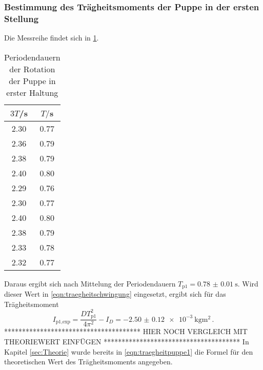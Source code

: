 \subsubsection{Bestimmung des Trägheitsmoments der Puppe in der ersten Stellung}
Die Messreihe findet sich in \ref{tab:puppe1}.
\begin{table}
\centering
\caption{Periodendauern der Rotation der Puppe in erster Haltung}
\label{tab:puppe1}
\begin{tabular}{c c}
\toprule
$3T$/s & $T/$s \\
\midrule
2.30 & 0.77 \\
2.36 & 0.79 \\
2.38 & 0.79 \\
2.40 & 0.80 \\
2.29 & 0.76 \\
2.30 & 0.77 \\
2.40 & 0.80 \\
2.38 & 0.79 \\
2.33 & 0.78 \\
2.32 & 0.77 \\
\bottomrule
\end{tabular}
\end{table}

Daraus ergibt sich nach Mittelung der Periodendauern
$T_{\text{p1}}=\SI{0.78(001)}{\second}$. Wird dieser Wert in
\eqref{eqn:traegheitschwingung} eingesetzt, ergibt sich für das Trägheitsmoment
\begin{equation}
  I_{\text{p1,exp}} = \frac{DT_{\text{p1}}^2}{4\pi^2}-I_D = \SI{-2.50(012)e-3}{\kilogram\meter\squared}\,.
\end{equation}
**************************************
HIER NOCH VERGLEICH MIT THEORIEWERT EINFÜGEN
**************************************
In Kapitel \ref{sec:Theorie} wurde bereits in \eqref{eqn:traegheitpuppe1} die
Formel für den theoretischen Wert des Trägheitsmoments angegeben.
